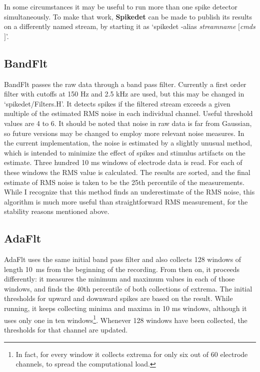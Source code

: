 \documentclass[12pt,oneside]{book}
\def\prog#1{{\bf #1}}
\def\streamtype#1{{\sc #1}\xspace}
\def\raw{\streamtype{raw}}
\begin{document}
In some circumstances it may be useful to run more than one spike
detector simultaneously. To make that work, \prog{Spikedet} can be
made to publish its results on a differently named stream, by starting
it as `spikedet -alias \emph{streamname} $[$\emph{cmds}$]$'.


\subsection{BandFlt}

BandFlt passes the \raw data through a band pass filter. Currently a
first order filter with cutoffs at 150 Hz and 2.5 kHz are used, but
this may be changed in `spikedet/Filters.H'. It detects spikes if the
filtered stream exceeds a given multiple of the estimated RMS noise in
each individual channel. Useful threshold values are 4 to 6. It should
be noted that noise in \raw data is far from Gaussian, so future
versions may be changed to employ more relevant noise measures. In the
current implementation, the noise is estimated by a slightly unusual
method, which is intended to minimize the effect of spikes and
stimulus artifacts on the estimate. Three hundred 10 ms windows of
electrode data is read. For each of these windows the RMS value is
calculated. The results are sorted, and the final estimate of RMS
noise is taken to be the 25th percentile of the measurements. While I
recognize that this method finds an underestimate of the RMS noise,
this algorithm is much more useful than straightforward RMS
measurement, for the stability reasons mentioned above.

\subsection{AdaFlt}

AdaFlt uses the same initial band pass filter and also collects 128
windows of length 10~ms from the beginning of the recording.
From then on, it proceeds differently: it measures the minimum and
maximum values in each of those windows, and finds the 40th percentile
of both collections of extrema. The initial thresholds for upward and
downward spikes are based on the result. While running, it keeps
collecting minima and maxima in 10 ms windows, although it uses only
one in ten windows\footnote{In fact, for every window it collects
extrema for only six out of 60 electrode channels, to spread the
computational load.}. Whenever 128 windows have been collected, the
thresholds for that channel are updated.
\end{document}
